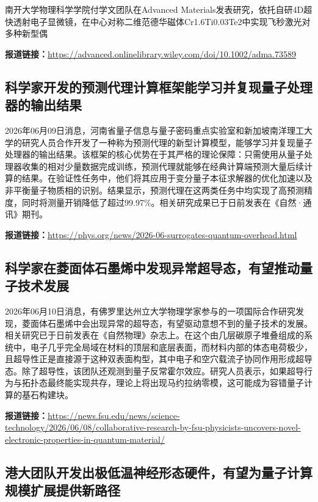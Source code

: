 \documentclass[12pt,a4paper]{ctexart}
\begin{document}
南开大学物理科学学院付学文团队在Advanced Materials发表研究，依托自研4D超快透射电子显微镜，在中心对称二维范德华磁体Cr1.6Ti0.03Te2中实现飞秒激光对多种新型偶

\noindent\textbf{报道链接：}\url{https://advanced.onlinelibrary.wiley.com/doi/10.1002/adma.73589}

\subsection{ 科学家开发的预测代理计算框架能学习并复现量子处理器的输出结果 }

2026年06月09日消息，河南省量子信息与量子密码重点实验室和新加坡南洋理工大学的研究人员合作开发了一种称为预测代理的新型计算模型，能够学习并复现量子处理器的输出结果。该框架的核心优势在于其严格的理论保障：只需使用从量子处理器收集的相对少量数据完成训练，预测代理就能够在经典计算端预测大量后续计算的结果。在验证性任务中，他们将其应用于变分量子本征求解器的优化加速以及非平衡量子物质相的识别。结果显示，预测代理在这两类任务中均实现了高预测精度，同时将测量开销降低了超过99.97\%。相关研究成果已于日前发表在《自然·通讯》期刊。

\noindent\textbf{报道链接：}\url{https://phys.org/news/2026-06-surrogates-quantum-overhead.html}

\subsection{ 科学家在菱面体石墨烯中发现异常超导态，有望推动量子技术发展 }

2026年06月10日消息，有佛罗里达州立大学物理学家参与的一项国际合作研究发现，菱面体石墨烯中会出现异常的超导态，有望驱动意想不到的量子技术的发展。相关研究已于日前发表在《自然物理》杂志上。在这个由几层碳原子堆叠组成的系统中，电子几乎完全局域在材料的顶层和底层表面，而材料内部的体态电荷极少，且超导性正是直接源于这种双表面构型，其中电子和空穴载流子协同作用形成超导态。除了超导性，该团队还观测到量子反常霍尔效应。研究人员表示，如果超导行为与拓扑态最终能实现共存，理论上将出现马约拉纳零模，这可能成为容错量子计算的基石构建块。

\noindent\textbf{报道链接：}\url{https://news.fsu.edu/news/science-technology/2026/06/08/collaborative-research-by-fsu-physicists-uncovers-novel-electronic-properties-in-quantum-material/}

\subsection{ 港大团队开发出极低温神经形态硬件，有望为量子计算规模扩展提供新路径 }
\end{document}
